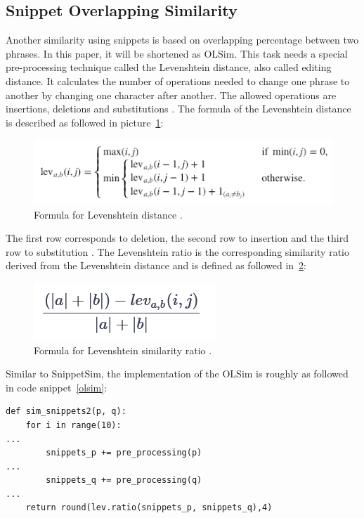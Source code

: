 \documentclass[conference]{IEEEtran}
\begin{document}
\subsection{Snippet Overlapping Similarity}\label{subsec:wup}

Another similarity using snippets is based on overlapping percentage between two phrases. In this paper, it will be shortened as OLSim. This task needs a special pre-processing technique called the Levenshtein distance, also called editing distance. It calculates the number of operations needed to change one phrase to another by changing one character after another. The allowed operations are insertions, deletions and substitutions \cite{navarro}. The formula of the Levenshtein distance is described as followed in picture~\ref{fig:lev}:

\begin{figure}[h]
\centerline{\includegraphics[scale=0.6]{img/lev.png}}
\caption{Formula for Levenshtein distance \cite{fuzzy}.}
\label{fig:lev}
\end{figure}

The first row corresponds to deletion, the second row to insertion and the third row to substitution \cite{fuzzy}. The Levenshtein ratio is the corresponding similarity ratio derived from the Levenshtein distance \cite{fuzzy} and is defined as followed in~\ref{fig:levratio}:

\begin{figure}[h]
\centerline{\includegraphics[scale=0.6]{img/levratio.png}}
\caption{Formula for Levenshtein similarity ratio \cite{fuzzy}.}
\label{fig:levratio}
\end{figure}

Similar to SnippetSim, the implementation of the OLSim is roughly as followed in code snippet~\ref{olsim}:

\begin{lstlisting}[frame=single, label=lst:olsim, caption={Calculation of OLSim}, captionpos=b]
def sim_snippets2(p, q):
    for i in range(10):
...
        snippets_p += pre_processing(p)
...
        snippets_q += pre_processing(q)   
...
    return round(lev.ratio(snippets_p, snippets_q),4)
\end{lstlisting}
\end{document}

